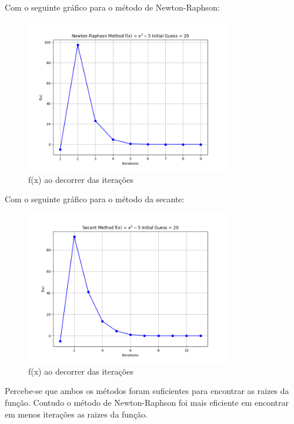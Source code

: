 \documentclass[12pt, a4paper]{article} %
\begin{document}
            Com o seguinte gr\'afico para o m\'etodo de Newton-Raphson:
            \begin{figure}[H]
                \centering
                \includegraphics[width=0.8\textwidth]{../images/grafic-ex-2-newton-raphson-method-20.png}
                \caption{f(x) ao decorrer das itera\c{c}\~oes}
            \end{figure}
            Com o seguinte gr\'afico para o m\'etodo da secante:
            \begin{figure}[H]
                \centering
                \includegraphics[width=0.8\textwidth]{../images/grafic-ex-2-secant-method-20.png}
                \caption{f(x) ao decorrer das itera\c{c}\~oes}
            \end{figure}

        Percebe-se que ambos os m\'etodos foram suficientes para encontrar as raizes da fun\c{c}\~ao. Contudo o m\'etodo de Newton-Raphson foi mais eficiente em encontrar em menos itera\c{c}\~oes as raizes da fun\c{c}\~ao.
\end{document}
